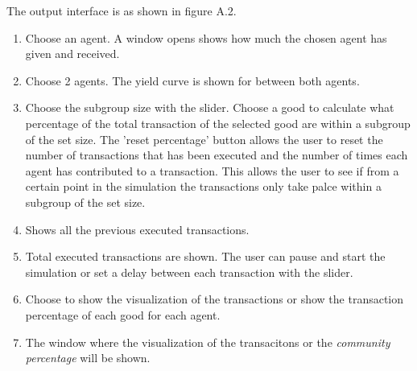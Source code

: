 \documentclass[twoside,openright]{uva-bachelor-thesis}
\begin{document}
The output interface is as shown in figure A.2.
\begin{enumerate}
\item Choose an agent. A window opens shows how much the chosen agent has given and received.
\item Choose 2 agents. The yield curve is shown for between both agents.
\item Choose the subgroup size with the slider. Choose a good to calculate what percentage of the total transaction of the selected good are within a subgroup of the set size. The 'reset percentage' button allows the user to reset the number of transactions that has been executed and the number of times each agent has contributed to a transaction. This allows the user to see if from a certain point in the simulation the transactions only take palce within a subgroup of the set size.
\item Shows all the previous executed transactions.
\item Total executed transactions are shown. The user can pause and start the simulation or set a delay between each transaction with the slider.
\item Choose to show the visualization of the transactions or show the transaction percentage of each good for each agent.
\item The window where the visualization of the transacitons or the \textit{community percentage} will be shown.
\end{enumerate}
\end{document}
